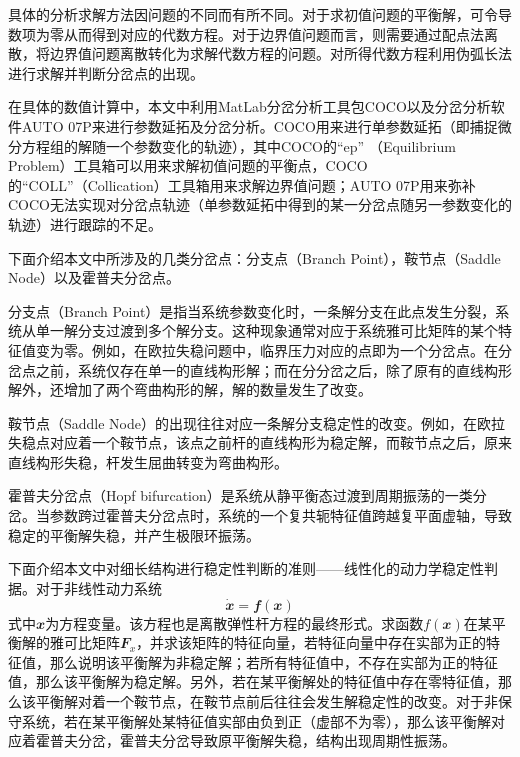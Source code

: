 具体的分析求解方法因问题的不同而有所不同。对于求初值问题的平衡解，可令导数项为零从而得到对应的代数方程。对于边界值问题而言，则需要通过配点法\cite{russell1972collocation}离散，将边界值问题离散转化为求解代数方程的问题。对所得代数方程利用伪弧长法\cite{zhong2021differential,seydel2009practical}进行求解并判断分岔点的出现。

在具体的数值计算中，本文中利用MatLab分岔分析工具包COCO\cite{dankowicz2013recipes}以及分岔分析软件AUTO 07P\cite{doedel2007auto}来进行参数延拓及分岔分析。COCO用来进行单参数延拓（即捕捉微分方程组的解随一个参数变化的轨迹），其中COCO的“ep” （Equilibrium Problem）工具箱可以用来求解初值问题的平衡点，COCO的“COLL”（Collication）工具箱用来求解边界值问题；AUTO 07P用来弥补COCO无法实现对分岔点轨迹（单参数延拓中得到的某一分岔点随另一参数变化的轨迹）进行跟踪的不足。

下面介绍本文中所涉及的几类分岔点：分支点（Branch Point），鞍节点（Saddle Node）以及霍普夫分岔点。

分支点（Branch Point）是指当系统参数变化时，一条解分支在此点发生分裂，系统从单一解分支过渡到多个解分支。这种现象通常对应于系统雅可比矩阵的某个特征值变为零。例如，在欧拉失稳问题中，临界压力对应的点即为一个分岔点。在分岔点之前，系统仅存在单一的直线构形解；而在分分岔之后，除了原有的直线构形解外，还增加了两个弯曲构形的解，解的数量发生了改变。

鞍节点（Saddle Node）的出现往往对应一条解分支稳定性的改变。例如，在欧拉失稳点对应着一个鞍节点，该点之前杆的直线构形为稳定解，而鞍节点之后，原来直线构形失稳，杆发生屈曲转变为弯曲构形。

霍普夫分岔点（Hopf bifurcation）是系统从静平衡态过渡到周期振荡的一类分岔。当参数跨过霍普夫分岔点时，系统的一个复共轭特征值跨越复平面虚轴，导致稳定的平衡解失稳，并产生极限环振荡。

下面介绍本文中对细长结构进行稳定性判断的准则——线性化的动力学稳定性判据。对于非线性动力系统
\begin{equation}
	\dot{\mathbfit{x}}=\mathbfit{f}\left(\mathbfit{x}\right)
\end{equation}
式中$\mathbfit{x}$为方程变量。该方程也是离散弹性杆方程的最终形式。求函数$f\left(\mathbfit{x}\right)$在某平衡解的雅可比矩阵$\mathbfit{F}_x$，并求该矩阵的特征向量，若特征向量中存在实部为正的特征值，那么说明该平衡解为非稳定解；若所有特征值中，不存在实部为正的特征值，那么该平衡解为稳定解。另外，若在某平衡解处的特征值中存在零特征值，那么该平衡解对着一个鞍节点，在鞍节点前后往往会发生解稳定性的改变。对于非保守系统，若在某平衡解处某特征值实部由负到正（虚部不为零），那么该平衡解对应着霍普夫分岔，霍普夫分岔导致原平衡解失稳，结构出现周期性振荡。

